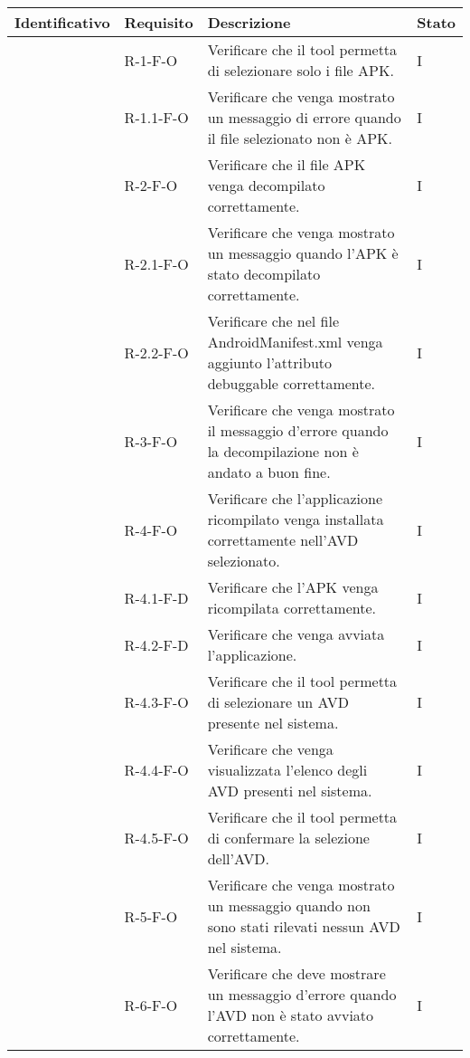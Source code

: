 \begin{center}
    \begin{longtable}{ | C{2.5cm} |C{2cm} |C{7cm} |C{1.5cm}|}
        \hline
        \textbf{Identificativo} &
        \textbf{Requisito} &
        \textbf{Descrizione} &
        \textbf{Stato} \\\hline

         & R-1-F-O    &Verificare che il tool permetta di selezionare solo i file APK. & I \\\hline
         & R-1.1-F-O  &Verificare che venga mostrato un messaggio di errore quando il file selezionato non è APK. & I \\\hline
         & R-2-F-O    &Verificare che il file APK venga decompilato correttamente.& I \\\hline
         & R-2.1-F-O  &Verificare che venga mostrato un messaggio quando l'APK è stato decompilato correttamente.& I \\\hline
         & R-2.2-F-O  &Verificare che nel file AndroidManifest.xml venga aggiunto l'attributo debuggable correttamente.& I \\\hline
         & R-3-F-O    &Verificare che venga mostrato il messaggio d'errore quando la decompilazione non è andato a buon fine.& I \\\hline
         & R-4-F-O    &Verificare che l'applicazione ricompilato venga installata correttamente nell'AVD selezionato.& I \\\hline
         & R-4.1-F-D  &Verificare che l'APK venga ricompilata correttamente.& I \\\hline
         & R-4.2-F-D  &Verificare che venga avviata l'applicazione.& I \\\hline
         & R-4.3-F-O  &Verificare che il tool permetta di selezionare un AVD presente nel sistema.& I \\\hline
         & R-4.4-F-O  &Verificare che venga visualizzata l'elenco degli AVD presenti nel sistema.& I \\\hline
         & R-4.5-F-O  &Verificare che il tool permetta di confermare la selezione dell'AVD.& I \\\hline
         & R-5-F-O    &Verificare che venga mostrato un messaggio quando non sono stati rilevati nessun AVD nel sistema.& I \\\hline
         & R-6-F-O    &Verificare che deve mostrare un messaggio d'errore quando l'AVD non è stato avviato correttamente.& I \\\hline

\end{longtable}
\end{center}
